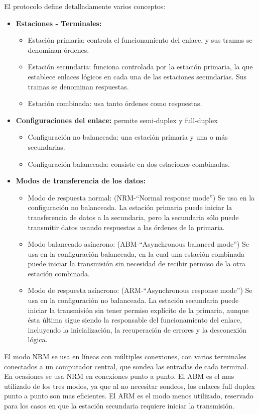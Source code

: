 \documentclass[withindex,glossary]{cam-thesis}
\begin{document}
El protocolo define detalladamente varios conceptos:
\begin{itemize}
\item \textbf{Estaciones - Terminales:}
	\begin{itemize}[label={--}]
	\item Estación primaria: controla el funcionamiento del enlace, y sus tramas se denominan órdenes.
    \item Estación secundaria: funciona controlada por la estación primaria, la que establece enlaces lógicos en cada una de las estaciones secundarias. Sus tramas se denominan respuestas.
    \item Estación combinada: usa tanto órdenes como respuestas.
	\end{itemize}
\item \textbf{Configuraciones del enlace:} permite semi-duplex y full-duplex
	\begin{itemize}[label={--}]
	\item Configuración no balanceada: una estación primaria y una o más secundarias.
    \item Configuración balanceada: consiste en dos estaciones combinadas.
	\end{itemize}
\item \textbf{Modos de transferencia de los datos:}
	\begin{itemize}[label={--}]
	\item Modo de respuesta normal: (NRM-“Normal response mode”) Se usa en la configuración no balanceada. La estación primaria puede iniciar la transferencia de datos a la secundaria, pero la secundaria sólo puede transmitir datos usando respuestas a las órdenes de la primaria.
    \item Modo balanceado asíncrono: (ABM-“Asynchronous balanced mode”) Se usa en la configuración balanceada, en la cual una estación combinada puede iniciar la transmisión sin necesidad de recibir permiso de la otra estación combinada.
    \item Modo de respuesta asíncrono: (ARM-“Asynchronous response mode”) Se usa en la configuración no balanceada. La estación secundaria puede iniciar la transmisión sin tener permiso explícito de la primaria, aunque ésta última sigue siendo la responsable del funcionamiento del enlace, incluyendo la inicialización, la recuperación de errores y la desconexión lógica.
	\end{itemize}
\end{itemize}
El modo NRM se usa en líneas con múltiples conexiones, con varios terminales conectados a un computador central, que sondea las entradas de cada terminal. En ocasiones se usa NRM en conexiones punto a punto. El ABM es el mas utilizado de los tres modos, ya que al no necesitar sondeos, los enlaces full duplex punto a punto son mas eficientes.
El ARM es el modo menos utilizado, reservado para los casos en que la estación secundaria requiere iniciar la transmisión.
\end{document}
